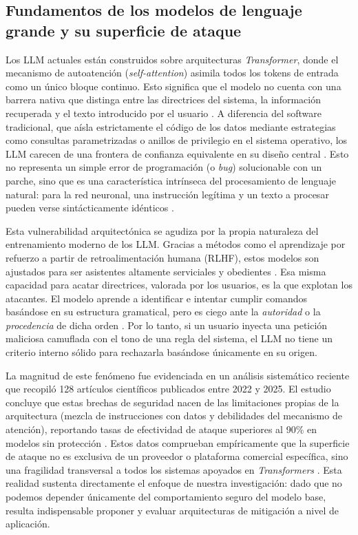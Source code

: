 \documentclass[twocolumn]{article}
\begin{document}
\subsection{Fundamentos de los modelos de lenguaje grande y su superficie de ataque}
\label{sec:superficie}

Los LLM actuales están construidos sobre arquitecturas \textit{Transformer}, donde el mecanismo de autoatención (\textit{self-attention}) asimila todos los tokens de entrada como un único bloque continuo. Esto significa que el modelo no cuenta con una barrera nativa que distinga entre las directrices del sistema, la información recuperada y el texto introducido por el usuario \cite{ref11}. A diferencia del software tradicional, que aísla estrictamente el código de los datos mediante estrategias como consultas parametrizadas o anillos de privilegio en el sistema operativo, los LLM carecen de una frontera de confianza equivalente en su diseño central \cite{ref11}. Esto no representa un simple error de programación (o \textit{bug}) solucionable con un parche, sino que es una característica intrínseca del procesamiento de lenguaje natural: para la red neuronal, una instrucción legítima y un texto a procesar pueden verse sintácticamente idénticos \cite{ref11}.

Esta vulnerabilidad arquitectónica se agudiza por la propia naturaleza del entrenamiento moderno de los LLM. Gracias a métodos como el aprendizaje por refuerzo a partir de retroalimentación humana (RLHF), estos modelos son ajustados para ser asistentes altamente serviciales y obedientes \cite{ref11}. Esa misma capacidad para acatar directrices, valorada por los usuarios, es la que explotan los atacantes. El modelo aprende a identificar e intentar cumplir comandos basándose en su estructura gramatical, pero es ciego ante la \textit{autoridad} o la \textit{procedencia} de dicha orden \cite{ref11}. Por lo tanto, si un usuario inyecta una petición maliciosa camuflada con el tono de una regla del sistema, el LLM no tiene un criterio interno sólido para rechazarla basándose únicamente en su origen.

La magnitud de este fenómeno fue evidenciada en un análisis sistemático reciente que recopiló 128 artículos científicos publicados entre 2022 y 2025. El estudio concluye que estas brechas de seguridad nacen de las limitaciones propias de la arquitectura (mezcla de instrucciones con datos y debilidades del mecanismo de atención), reportando tasas de efectividad de ataque superiores al 90\% en modelos sin protección \cite{ref4}. Estos datos comprueban empíricamente que la superficie de ataque no es exclusiva de un proveedor o plataforma comercial específica, sino una fragilidad transversal a todos los sistemas apoyados en \textit{Transformers} \cite{ref11}. Esta realidad sustenta directamente el enfoque de nuestra investigación: dado que no podemos depender únicamente del comportamiento seguro del modelo base, resulta indispensable proponer y evaluar arquitecturas de mitigación a nivel de aplicación.
\end{document}
